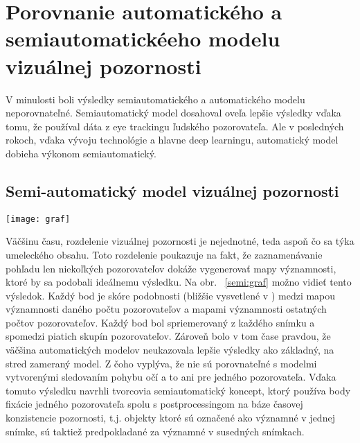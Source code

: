 \documentclass[10pt,twoside,slovak,a4paper]{article}
\begin{document}
\section{Porovnanie automatického a semiautomatickéeho modelu vizuálnej pozornosti} \label{porovnanie}
V minulosti boli výsledky semiautomatického a automatického modelu neporovnateľné. Semiautomatický model dosahoval oveľa lepšie výsledky vďaka tomu, že používal dáta z eye trackingu ľudského pozorovateľa. Ale v posledných rokoch, vďaka vývoju technológie a hlavne deep learningu, automatický model dobieha výkonom semiautomatický.

\subsection{Semi-automatický model vizuálnej pozornosti} \label{semi-auto}
\begin{figure*}[tbh]
\centering
\texttt{[image: graf]}
\caption{poukazuje na vzťah medzi počtom pozorovateľov a presnosťou máp významnosti}
\label{semi:graf}
\end{figure*}
Väčšinu času, rozdelenie vizuálnej pozornosti je nejednotné, teda aspoň čo sa týka umeleckého obsahu. Toto rozdelenie poukazuje na fakt, že zaznamenávanie pohľadu len niekoľkých pozorovateľov dokáže vygenerovať mapy významnosti, ktoré by sa podobali ideálnemu výsledku. Na obr. ~\ref{semi:graf} možno vidieť tento výsledok. Každý bod je skóre podobnosti (bližšie vysvetlené v \cite{Azam2016:sim}) medzi mapou významnosti daného počtu pozorovateľov a mapami významnosti ostatných počtov pozorovateľov. Každý bod bol spriemerovaný z každého snímku a spomedzi piatich skupín pozorovateľov. Zároveň bolo v tom čase pravdou, že väčšina automatických modelov neukazovala lepšie výsledky ako základný, na stred zameraný model. Z čoho vyplýva, že nie sú porovnateľné s modelmi vytvorenými sledovaním pohybu očí a to ani pre jedného pozorovateľa. Vďaka tomuto výsledku navrhli tvorcovia\cite{Coplien:MPD} semiautomatický koncept, ktorý používa body fixácie jedného pozorovateľa spolu s postprocessingom na báze časovej konzistencie pozornosti, t.j. objekty ktoré sú označené ako významné v jednej snímke, sú taktiež predpokladané za významné v susedných snímkach.
\end{document}
